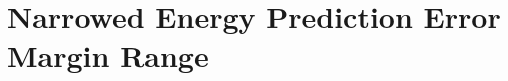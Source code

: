 \documentclass[%
    draft, %
    11pt,
    a4paper
]
{memoir}
\begin{document}
\chapter{Narrowed Energy Prediction Error Margin Range}
\label{sec:Appendix:NarrowedEnergyPredictionErrorMarginRange}






\end{document}
